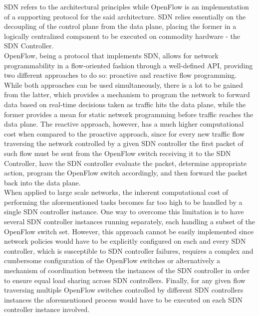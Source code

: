 \gls{SDN} refers to the architectural principles while OpenFlow is an implementation of a supporting protocol for the said architecture.
\gls{SDN} relies essentially on the decoupling of the control plane from the data plane, placing the former in a logically centralized component to be executed on commodity hardware - the \gls{SDN} Controller.\\
%
OpenFlow, being a protocol that implements \gls{SDN}, allows for network programmability in a flow-oriented fashion through a well-defined \gls{API}, providing two different approaches to do so: proactive and reactive flow programming.
While both approaches can be used simultaneously, there is a lot to be gained from the latter, which provides a mechanism to program the network to forward data based on real-time decisions taken as traffic hits the data plane, while the former provides a mean for static network programming before traffic reaches the data plane.
The reactive approach, however, has a much higher computational cost when compared to the proactive approach, since for every new traffic flow traversing the network controlled by a given \gls{SDN} controller the first packet of such flow must be sent from the OpenFlow switch receiving it to the \gls{SDN} Controller, have the \gls{SDN} controller evaluate the packet, determine appropriate action, program the OpenFlow switch accordingly, and then forward the packet back into the data plane.\\
%
When applied to large scale networks, the inherent computational cost of performing the aforementioned tasks becomes far too high to be handled by a single \gls{SDN} controller instance.
One way to overcome this limitation is to have several \gls{SDN} controller instances running separately, each handling a subset of the OpenFlow switch set.
However, this approach cannot be easily implemented since network policies would have to be explicitly configured on each and every \gls{SDN} controller, which is susceptible to \gls{SDN} controller failures, requires a complex and cumbersome configuration of the OpenFlow switches or alternatively a mechanism of coordination between the instances of the \gls{SDN} controller in order to ensure equal load sharing across \gls{SDN} controllers.
Finally, for any given flow traversing multiple OpenFlow switches controlled by different \gls{SDN} controllers instances the aforementioned process would have to be executed on each \gls{SDN} controller instance involved.\\
%
